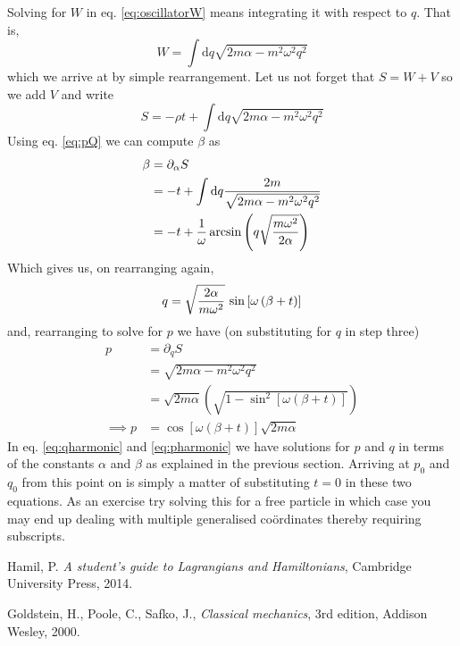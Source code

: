 \documentclass[english,seminar,headertitle]{lecture}
\begin{document}
Solving for $W$ in eq. \eqref{eq:oscillatorW} means integrating it with respect to $q$. That is,
$$
W = \int \textrm{d}q \sqrt{2m\alpha - m^2\omega^2q^2}
$$
which we arrive at by simple rearrangement. Let us not forget that $S = W + V$ so we add $V$ and write
$$
S = -\rho t + \int \textrm{d}q \sqrt{2m\alpha - m^2\omega^2q^2}
$$
Using eq. \eqref{eq:pQ} we can compute $\beta$ as
\begin{align*}
\beta &= \partial_\alpha S \\
		&= -t + \int \textrm{d}q {2m \over \sqrt{2m\alpha - m^2\omega^2q^2}} \\
		&= -t + {1\over \omega} \arcsin \left( q\sqrt{m\omega^2\over 2\alpha} \right)
\end{align*}%
Which gives us, on rearranging again,
\begin{equation}
	q = \sqrt{2\alpha \over m\omega^2} \, \sin \left[ \omega \left( \beta + t \right) \right] \label{eq:qharmonic}
\end{equation}
and, rearranging to solve for $p$ we have (on substituting for $q$ in step three)
\begin{align}
p &= \partial_q S \nonumber\\
		&= \sqrt{2m\alpha - m^2\omega^2q^2} \nonumber\\
		&= \sqrt{2m\alpha}\left( \sqrt{1 - \sin^2 \left[ \omega \left( \beta + t \right) \right]} \right) \nonumber\\
 \implies p &= \cos \left[ \omega \left( \beta + t \right) \right] \sqrt{2m\alpha} \label{eq:pharmonic}
\end{align}%
In eq. \eqref{eq:qharmonic} and \eqref{eq:pharmonic} we have solutions for $p$ and $q$ in terms of the constants $\alpha$ and $\beta$ as explained in the previous section. Arriving at $p_0$ and $q_0$ from this point on is simply a matter of substituting $t=0$ in these two equations. As an exercise try solving this for a free particle in which case you may end up dealing with multiple generalised co\"{o}rdinates thereby requiring subscripts.
%
\begin{thebibliography}{1}
	Hamil, P. \textit{A student's guide to Lagrangians and Hamiltonians}, Cambridge University Press, 2014.
	
	Goldstein, H., Poole, C., Safko, J., \textit{Classical mechanics}, 3rd edition, Addison Wesley, 2000.
\end{thebibliography}
\end{document}
